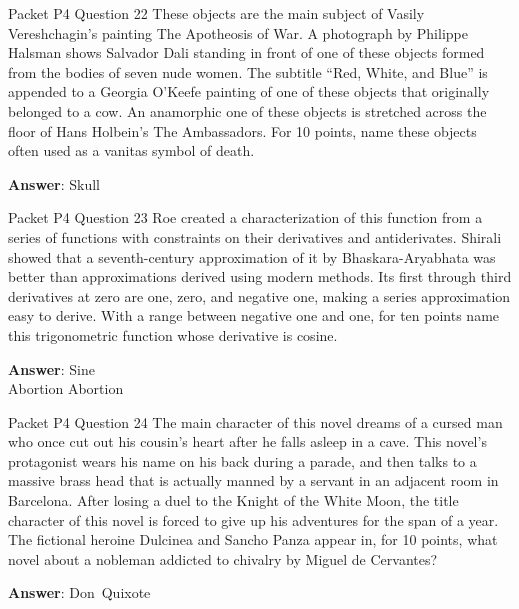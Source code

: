 \begin{frame}{Packet P4 Question 22}
These objects are the main subject of Vasily Vereshchagin’s painting   The Apotheosis of War. A photograph by Philippe Halsman shows Salvador Dali standing in front of one of these objects formed from the bodies of seven nude women. The subtitle “Red, White, and Blue” is appended to a Georgia O’Keefe painting of one of these objects that originally belonged to a cow. An anamorphic one of these objects is stretched across the floor of Hans Holbein’s The Ambassadors. For 10 points,     name these objects often used as a vanitas   symbol of death.

\textbf{Answer}: Skull\\
\end{frame}

\begin{frame}{Packet P4 Question 23}
Roe created a characterization   of this function from a series of functions with constraints   on their derivatives and antiderivates.  Shirali showed that a seventh-century approximation of it by Bhaskara-Aryabhata was better than approximations derived using modern methods.  Its first through third derivatives at zero are one, zero, and negative one, making a series approximation easy to derive.  With a range between negative one and one, for ten points name this trigonometric function   whose derivative   is cosine.  

\textbf{Answer}: Sine\\
 Abortion
 Abortion
\end{frame}

\begin{frame}{Packet P4 Question 24}
The main character of this novel dreams of a cursed man who once cut out his cousin's heart after he falls asleep in a cave. This novel's protagonist wears his name on his back during a parade, and then talks to a massive brass head that is actually manned by a servant in an adjacent room in Barcelona. After losing a duel to the Knight of the White Moon, the title   character of this novel is forced to give up his adventures for the span of a year. The fictional heroine Dulcinea       and Sancho Panza appear in, for 10 points, what novel about a nobleman addicted to chivalry by Miguel de Cervantes?

\textbf{Answer}: Don\ Quixote\\
\end{frame}

